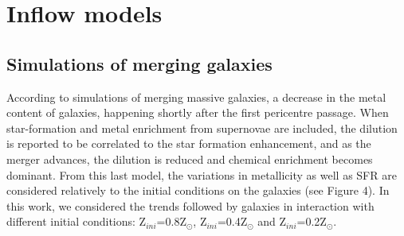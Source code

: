 \documentclass{nature2}
\begin{document}
\section{Inflow models}
\label{sec:models}
\subsection{Simulations of merging galaxies}
According to simulations of merging massive galaxies, a decrease in the metal content of galaxies, happening shortly after the first pericentre passage\cite{Rupke_2010}. When star-formation and metal enrichment from supernovae are included\cite{Montuori_2010}, the dilution is reported to be correlated to the star formation enhancement, and as the merger advances, the dilution is reduced and chemical enrichment becomes dominant. From this last model, the variations in metallicity as well as SFR are considered relatively to the initial conditions on the galaxies (see Figure 4\cite{Montuori_2010}). In this work, we considered the trends followed by galaxies in interaction with different initial conditions: Z\ensuremath{_{ini}}=0.8Z\ensuremath{_{\odot}}, Z\ensuremath{_{ini}}=0.4Z\ensuremath{_{\odot}} and Z\ensuremath{_{ini}}=0.2Z\ensuremath{_{\odot}}.
\end{document}
